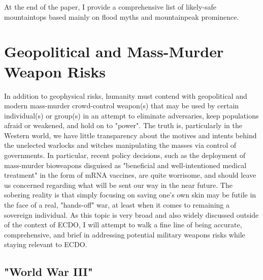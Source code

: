 \documentclass[10pt,twocolumn,letterpaper]{article}
\begin{document}
At the end of the paper, I provide a comprehensive list of likely-safe mountaintops based mainly on flood myths and mountainpeak prominence.

\section{Geopolitical and Mass-Murder Weapon Risks}

In addition to geophysical risks, humanity must contend with geopolitical and modern mass-murder crowd-control weapon(s) that may be used by certain individual(s) or group(s) in an attempt to eliminate adversaries, keep populations afraid or weakened, and hold on to "power". The truth is, particularly in the Western world, we have little transparency about the motives and intents behind the unelected warlocks and witches manipulating the masses via control of governments. In particular, recent policy decisions, such as the deployment of mass-murder bioweapons disguised as "beneficial and well-intentioned medical treatment" in the form of mRNA vaccines, are quite worrisome, and should leave us concerned regarding what will be sent our way in the near future. The sobering reality is that simply focusing on saving one's own skin may be futile in the face of a real, "hands-off" war, at least when it comes to remaining a sovereign individual. As this topic is very broad and also widely discussed outside of the context of ECDO, I will attempt to walk a fine line of being accurate, comprehensive, and brief in addressing potential military weapons risks while staying relevant to ECDO.

\subsection{"World War III"}
\end{document}
